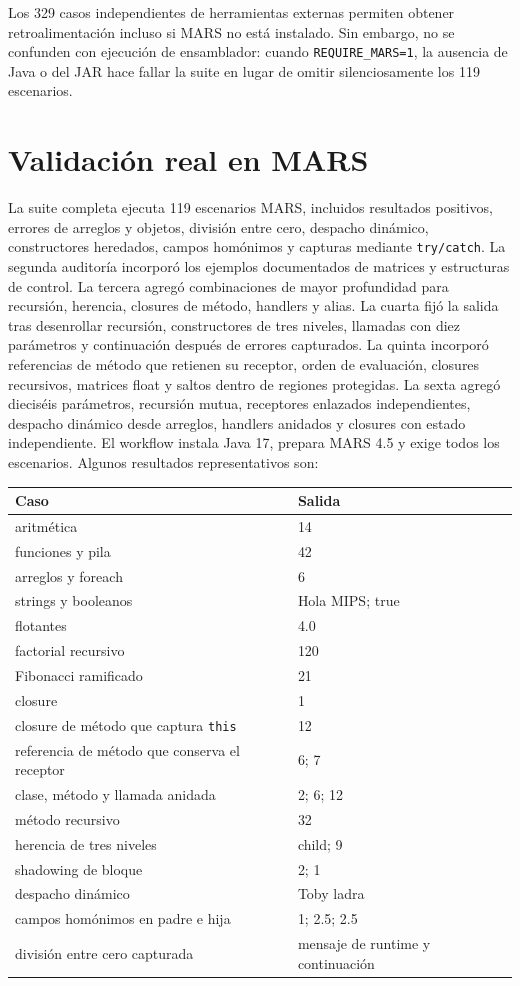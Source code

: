 \documentclass[11pt,letterpaper,oneside]{report}
\newcommand{\codigo}[1]{\texttt{#1}}
\begin{document}
Los 329 casos independientes de herramientas externas permiten obtener retroalimentaci\'on incluso si MARS no est\'a instalado. Sin embargo, no se confunden con ejecuci\'on de ensamblador: cuando \codigo{REQUIRE\_MARS=1}, la ausencia de Java o del JAR hace fallar la suite en lugar de omitir silenciosamente los 119 escenarios.

\section{Validaci\'on real en MARS}

La suite completa ejecuta 119 escenarios MARS, incluidos resultados positivos, errores de arreglos y objetos, divisi\'on entre cero, despacho din\'amico, constructores heredados, campos hom\'onimos y capturas mediante \codigo{try/catch}. La segunda auditor\'ia incorpor\'o los ejemplos documentados de matrices y estructuras de control. La tercera agreg\'o combinaciones de mayor profundidad para recursi\'on, herencia, closures de m\'etodo, handlers y alias. La cuarta fij\'o la salida tras desenrollar recursi\'on, constructores de tres niveles, llamadas con diez par\'ametros y continuaci\'on despu\'es de errores capturados. La quinta incorpor\'o referencias de m\'etodo que retienen su receptor, orden de evaluaci\'on, closures recursivos, matrices float y saltos dentro de regiones protegidas. La sexta agreg\'o diecis\'eis par\'ametros, recursi\'on mutua, receptores enlazados independientes, despacho din\'amico desde arreglos, handlers anidados y closures con estado independiente. El workflow instala Java 17, prepara MARS 4.5 y exige todos los escenarios. Algunos resultados representativos son:

\begin{longtable}{p{7cm}p{5cm}}
\toprule
Caso & Salida\\\midrule
aritm\'etica & 14\\
funciones y pila & 42\\
arreglos y foreach & 6\\
strings y booleanos & Hola MIPS; true\\
flotantes & 4.0\\
factorial recursivo & 120\\
Fibonacci ramificado & 21\\
closure & 1\\
closure de m\'etodo que captura \codigo{this} & 12\\
referencia de m\'etodo que conserva el receptor & 6; 7\\
clase, m\'etodo y llamada anidada & 2; 6; 12\\
m\'etodo recursivo & 32\\
herencia de tres niveles & child; 9\\
shadowing de bloque & 2; 1\\
despacho din\'amico & Toby ladra\\
campos hom\'onimos en padre e hija & 1; 2.5; 2.5\\
divisi\'on entre cero capturada & mensaje de runtime y continuaci\'on\\
\bottomrule
\end{longtable}
\end{document}

